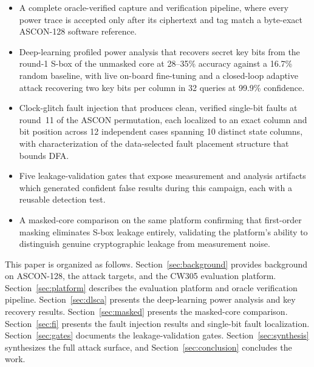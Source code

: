 \documentclass[conference]{IEEEtran}
\begin{document}
\begin{itemize}
  \item A complete oracle-verified capture and verification
    pipeline, where every power trace is accepted only after
    its ciphertext and tag match a byte-exact ASCON-128
    software reference.

  \item Deep-learning profiled power analysis that recovers
    secret key bits from the round-1 S-box of the unmasked
    core at 28--35\% accuracy against a 16.7\% random
    baseline, with live on-board fine-tuning and a
    closed-loop adaptive attack recovering two key bits per
    column in 32 queries at 99.9\% confidence.

  \item Clock-glitch fault injection that produces clean,
    verified single-bit faults at round~11 of the ASCON
    permutation, each localized to an exact column and bit
    position across 12 independent cases spanning 10 distinct
    state columns, with characterization of the data-selected
    fault placement structure that bounds DFA.

  \item Five leakage-validation gates that expose measurement
    and analysis artifacts which generated confident false
    results during this campaign, each with a reusable
    detection test.

  \item A masked-core comparison on the same platform
    confirming that first-order masking eliminates S-box
    leakage entirely, validating the platform's ability to
    distinguish genuine cryptographic leakage from
    measurement noise.
\end{itemize}

This paper is organized as follows. Section~\ref{sec:background}
provides background on ASCON-128, the attack targets, and the
CW305 evaluation platform. Section~\ref{sec:platform} describes
the evaluation platform and oracle verification pipeline.
Section~\ref{sec:dlsca} presents the deep-learning power
analysis and key recovery results. Section~\ref{sec:masked}
presents the masked-core comparison. Section~\ref{sec:fi}
presents the fault injection results and single-bit fault
localization. Section~\ref{sec:gates} documents the
leakage-validation gates. Section~\ref{sec:synthesis}
synthesizes the full attack surface, and
Section~\ref{sec:conclusion} concludes the work.

\end{document}
